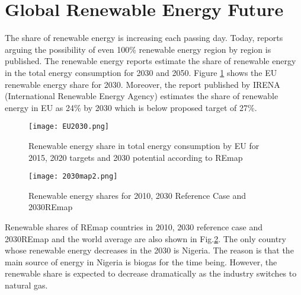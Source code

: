 \section{Global Renewable Energy Future}
The share of renewable energy is increasing each passing day. Today, reports arguing the possibility of even 100\% renewable energy region by region is published\cite{REN212017d}. The renewable energy reports estimate the share of renewable energy in the total energy consumption for 2030 and 2050. Figure \ref{EU2030} shows the EU renewable energy share for 2030. Moreover, the report published by IRENA (International Renewable Energy Agency) estimates the share of renewable energy in EU as 24\% by 2030 which is below proposed target of 27\%\cite{IRENA2014}.\par
\begin{figure}[h!]
	\centering
	\texttt{[image: EU2030.png]}
	\caption{Renewable energy share in total energy consumption by EU for 2015, 2020 targets and 2030 potential according to REmap \cite{EuropeanCommission2018}}
	\label{EU2030}
\end{figure}
\begin{figure}[h!]
	\centering
	\texttt{[image: 2030map2.png]}
	\caption{Renewable energy shares for 2010, 2030 Reference Case and 2030REmap \cite{IRENA2014}}
	\label{2030map}
\end{figure}
Renewable shares of REmap countries in 2010, 2030 reference case and 2030REmap and the world average are also shown in Fig.\ref{2030map}. The only country whose renewable energy decreases in the 2030 is Nigeria. The reason is that the main source of energy in Nigeria is biogas for the time being. However, the renewable share is expected to decrease dramatically as the industry switches to natural gas.
